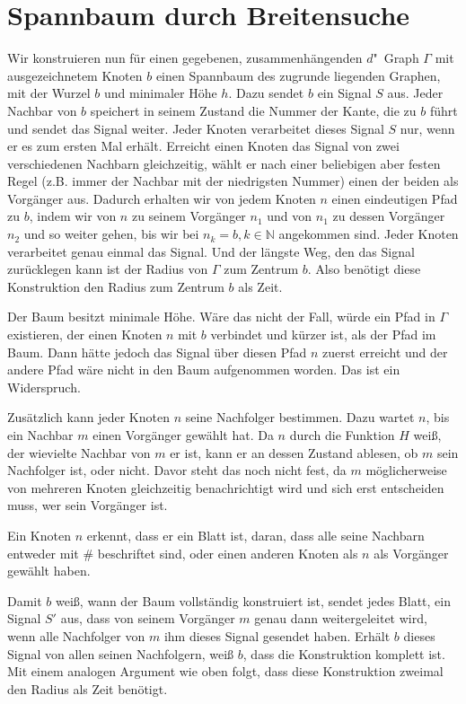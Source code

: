 \documentclass[11pt]{article}
\begin{document}
\section{Spannbaum durch Breitensuche}
Wir konstruieren nun für einen gegebenen, zusammenhängenden $d$"~Graph $\Gamma$ mit ausgezeichnetem Knoten $b$ einen Spannbaum des zugrunde liegenden Graphen, mit der Wurzel $b$ und minimaler Höhe $h$. 
Dazu sendet $b$ ein Signal $S$ aus. Jeder Nachbar von $b$ speichert in seinem Zustand die Nummer der Kante, die zu $b$ führt und sendet das Signal weiter. 
Jeder Knoten verarbeitet dieses Signal $S$ nur, wenn er es zum ersten Mal erhält. 
Erreicht einen Knoten das Signal von zwei verschiedenen Nachbarn gleichzeitig, wählt er nach einer beliebigen aber festen Regel (z.B. immer der Nachbar mit der niedrigsten Nummer) einen der beiden als Vorgänger aus. 
Dadurch erhalten wir von jedem Knoten $n$ einen eindeutigen Pfad zu $b$, indem wir von $n$ zu seinem Vorgänger $n_1$ und von $n_1$ zu dessen Vorgänger $n_2$ und so weiter gehen, bis wir bei $n_k=b, k \in \mathbb{N}$ angekommen sind. 
Jeder Knoten verarbeitet genau einmal das Signal. 
Und der längste Weg, den das Signal zurücklegen kann ist der Radius von $\Gamma$ zum Zentrum $b$. 
Also benötigt diese Konstruktion den Radius zum Zentrum $b$ als Zeit.

Der Baum besitzt minimale Höhe. 
Wäre das nicht der Fall, würde ein Pfad in $\Gamma$ existieren, der einen Knoten $n$ mit $b$ verbindet und kürzer ist, als der Pfad im Baum. 
Dann hätte jedoch das Signal über diesen Pfad $n$ zuerst erreicht und der andere Pfad wäre nicht in den Baum aufgenommen worden. 
Das ist ein Widerspruch.

Zusätzlich kann jeder Knoten $n$ seine Nachfolger bestimmen. 
Dazu wartet $n$, bis ein Nachbar $m$ einen Vorgänger gewählt hat.
Da $n$ durch die Funktion $H$ weiß, der wievielte Nachbar von $m$ er ist, kann er an dessen Zustand ablesen, ob $m$ sein Nachfolger ist, oder nicht. 
Davor steht das noch nicht fest, da $m$ möglicherweise von mehreren Knoten gleichzeitig benachrichtigt wird und sich erst entscheiden muss, wer sein Vorgänger ist.

Ein Knoten $n$ erkennt, dass er ein Blatt ist, daran, dass alle seine Nachbarn entweder mit $\#$ beschriftet sind, oder einen anderen Knoten als $n$ als Vorgänger gewählt haben.

Damit $b$ weiß, wann der Baum vollständig konstruiert ist, sendet jedes Blatt, ein Signal $S'$ aus, dass von seinem Vorgänger $m$ genau dann weitergeleitet wird, wenn alle Nachfolger von $m$ ihm dieses Signal gesendet haben. 
Erhält $b$ dieses Signal von allen seinen Nachfolgern, weiß $b$, dass die Konstruktion komplett ist.
Mit einem analogen Argument wie oben folgt, dass diese Konstruktion zweimal den Radius als Zeit benötigt.
\end{document}
